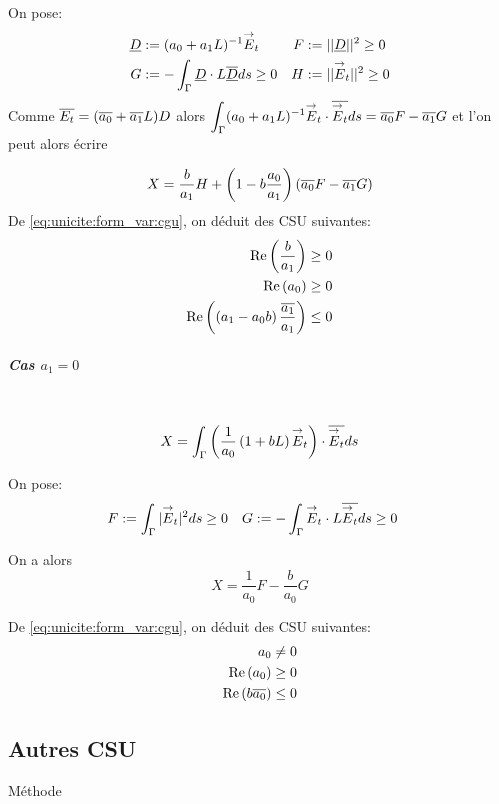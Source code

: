 					On pose:
					\begin{align*}
						\underline{D} &:= (a_0 + a_1 L)^{-1}{\overset{\rightarrow}{E}}_t & F&:= || \underline{D} || ^2 \ge 0  \\
						G&:= -\int_\Gamma \underline{D} \cdot L{\overline{\underline{D}}} ds \ge 0 & H &:= || {\overset{\rightarrow}{E}}_t || ^2 \ge 0
					\end{align*}
					Comme ${\overline{E_t}} = ({\overline{a_0}} + {\overline{a_1}}L)D$ alors $\displaystyle\int_\Gamma (a_0 +a_1 L) ^{-1}{\overset{\rightarrow}{E}}_t\cdot {\overline{{\overset{\rightarrow}{E}}_t}} ds = {\overline{a_0}} F - {\overline{a_1}} G$ et l'on peut alors écrire

					\begin{equation}
						\label{eq:unicite:form_var:decomp_cgu_ci1_a1}
						X = \dfrac{b}{a_1}H   + \left(1-b\dfrac{a_0}{a_1}\right)\left({\overline{a_0}} F - {\overline{a_1}} G\right)
					\end{equation}
					De \eqref{eq:unicite:form_var:cgu}, on déduit des CSU suivantes:
					\begin{align}
						\operatorname{Re}\left(\dfrac{b}{a_1}\right) \ge 0 \\
						\operatorname{Re}\left(a_0\right) \ge 0 \\
						\operatorname{Re}\left(\left(a_1-a_0 b\right)\dfrac{{\overline{a_1}}}{a_1}\right) \le 0
					\end{align}

				\subparagraph{Cas $a_1=0$}
					~
					\[
						X = \int_\Gamma \left( \dfrac{1}{a_0}\left(1+bL\right){\overset{\rightarrow}{E}}_t\right) \cdot {\overline{{\overset{\rightarrow}{E}}_t}} ds
					\]

					On pose:
					\begin{align*}
						F&:= \int_\Gamma | {\overset{\rightarrow}{E}}_t | ^2 ds \ge 0 & G &:= -\int_\Gamma {\overset{\rightarrow}{E}}_t \cdot L{\overline{{\overset{\rightarrow}{E}}_t}} ds \ge 0
					\end{align*}

					On a alors
					\begin{equation}
						\label{eq:unicite:form_var:decomp_cgu_ci1_a1_nul}
						X = \frac{1}{a_0}F - \frac{b}{a_0}G
					\end{equation}

					De \eqref{eq:unicite:form_var:cgu}, on déduit des CSU suivantes:
					\begin{align}
						a_0 \not= 0\\
						\operatorname{Re}\left(a_0\right) \ge 0\\
						\operatorname{Re}\left(b{\overline{a_0}}\right) \le 0
					\end{align}

	\subsection{Autres CSU}
		Méthode \cite{stupfel_implementation_2015}

